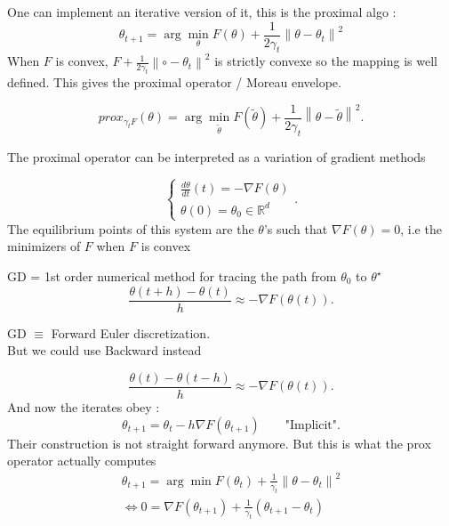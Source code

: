 \begin{note}
    One can implement an iterative version of it, this is the proximal algo : 
    \[ 
        \theta _{t+1} = \arg \min_{\theta} F(\theta) + \frac{1}{2 \gamma _t} \left\| \theta - \theta_t  \right\|^2 
    \]
    When $ F $ is convex, $ F + \frac{1}{2 \gamma _t} \left\| \circ  - \theta _t \right\| ^2 $ is strictly convexe so the mapping is well defined. This gives the proximal operator / Moreau envelope. 
    
    \[
        prox _{\gamma _t F} (\theta ) = \arg \min_{\tilde{\theta}} F(\tilde{\theta }) + \frac{1}{2 \gamma _t} \left\| \theta - \tilde{\theta}  \right\|^2 
    .\]

    The proximal operator can be interpreted as a variation of gradient methods 
    
    \[
        \begin{cases}
            \frac{d \theta }{dt}(t) = - \nabla F(\theta ) \\
            \theta (0) = \theta _0 \in \mathbb{R}^d
        \end{cases}
    .\]
    The equilibrium points of this system are the $\theta $'s such that $\nabla F(\theta )= 0$, i.e the minimizers of $ F $  when $ F $  is convex
    
    GD = 1st order numerical method for tracing the path from $ \theta _0 $ to $ \theta ^\star  $ 
    \[
        \frac{\theta (t + h) - \theta (t)}{h} \approx - \nabla F(\theta (t))
    .\]
    
    GD $\equiv$ Forward Euler discretization. \\
    But we could use Backward instead 
        
    \[
        \frac{\theta (t) - \theta (t -h)}{h} \approx - \nabla F(\theta (t))
    .\]
    And now the iterates obey :
    \[
        \theta_{t+1} = \theta _t - h \nabla F(\theta_{t+1}) \qquad \text{"Implicit"}
    .\]
    Their construction is not straight forward anymore. But this is what the prox operator actually computes 
    \begin{align*}
        \theta _{t+1} = \arg \min F(\theta _t) + \frac{1}{\gamma _t } \left\| \theta -\theta _t \right\| ^2 \\
        \Leftrightarrow 0 = \nabla F(\theta _{t + 1}) + \frac{1 }{\gamma _t} (\theta _{t+1} - \theta _t)
    \end{align*}
\end{note}



